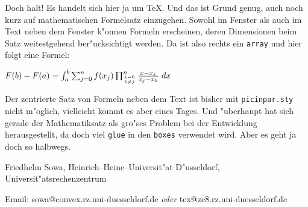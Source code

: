 \documentclass[german,picinpar]{article}
\begin{document}
\begin{window}[3,r,{\arraycolsep=2.5pt \def\arraystretch{.75}
$\left(\begin{array}{ccccccccc}%
         *&*&*&*&&&&&\\
        **&*&*&*&*&&&&\\ \cline{3-6}
         *&*&\multicolumn{1}{|c}{*}&*&*&\multicolumn{1}{c|}{*}&&&\\
         &*&\multicolumn{1}{|c}{*}&*&*&\multicolumn{1}{c|}{*}&*&&\\
         &&\multicolumn{1}{|c}{*}&*&*&\multicolumn{1}{c|}{*}&*&*&\\ \cline{3-6}
         &&&*&*&*&*&*&*\\
         &&&&*&*&*&*&*\\
         &&&&&*&*&*&*\\
         &&&&&&*&*&*
         \end{array}
   \right)$},{}]
Doch halt! Es handelt sich hier ja um \TeX{}. Und das ist Grund genug, auch
noch kurz auf mathematischen Formelsatz einzugehen. Sowohl im Fenster als
auch im Text neben dem Fenster k"onnen Formeln erscheinen, deren Dimensionen
beim Satz weitestgehend ber"ucksichtigt werden. Da ist also rechts ein
{\tt array} und hier folgt eine Formel:

\def\formel#1#2#3#4#5{#1(#4)-#1(#3)=
\int_{#3}^{#4}\sum_{j=0}^{#5}#2(x_j)
\prod_{{k=0}\atop{k\not= j}}^{#5}
{x-x_k\over x_j-x_k}\; dx}
$\formel Ffabn$

Der zentrierte Satz von Formeln neben dem Text ist bisher mit
{\tt picinpar.sty} nicht m"oglich, vielleicht kommt es aber eines
Tages. Und "uberhaupt hat sich gerade der Mathematiksatz als gro"ses
Problem bei der Entwicklung herausgestellt, da doch viel {\tt glue} in
den {\tt boxes} verwendet wird. Aber es geht ja doch so halbwegs.
\end{window}
\vfill
\centerline{Friedhelm Sowa, Heinrich--Heine--Universit"at D"usseldorf,
Universit"atsrechenzentrum}
\centerline{Email: sowa@convex.rz.uni-duesseldorf.de {\sl oder}
tex@ze8.rz.uni-duesseldorf.de}
\end{document}
